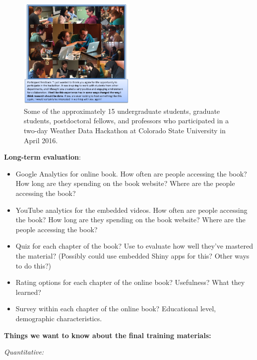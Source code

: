 \documentclass[pdftex,english,11pt,parskip=half]{scrartcl}
\begin{document}
\begin{figure}[h]
\begin{center}
\includegraphics[width=0.5\textwidth]{figures/csu_hackathon.png}
\end{center}
\caption{\label{csu-r-hackathon} Some of the approximately 15 undergraduate students, graduate students, postdoctoral fellows, and professors who participated in a two-day Weather Data Hackathon at Colorado State University in April 2016.}
\end{figure}

\textbf{Long-term evaluation}:

\begin{itemize}
\item Google Analytics for online book. How often are people accessing the book? How long are they spending on the book website? Where are the people accessing the book?
\item YouTube analytics for the embedded videos. How often are people accessing the book? How long are they spending on the book website? Where are the people accessing the book?
\item Quiz for each chapter of the book? Use to evaluate how well they've mastered the material? (Possibly could use embedded Shiny apps for this? Other ways to do this?)
\item Rating options for each chapter of the online book? Usefulness? What they learned?
\item Survey within each chapter of the online book? Educational level, demographic characteristics.
\end{itemize}

\textbf{Things we want to know about the final training materials:}

\textit{Quantitative:}
\end{document}
